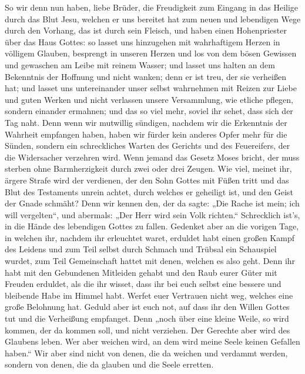  So wir denn nun haben, liebe Brüder, die Freudigkeit zum
Eingang in das Heilige durch das Blut Jesu,  welchen er
uns bereitet hat zum neuen und lebendigen Wege durch den Vorhang, das
ist durch sein Fleisch,  und haben einen Hohenpriester
über das Haus Gottes:  so lasset uns hinzugehen mit
wahrhaftigem Herzen in völligem Glauben, besprengt in unseren Herzen und
los von dem bösen Gewissen und gewaschen am Leibe mit reinem Wasser;
 und lasset uns halten an dem Bekenntnis der Hoffnung und
nicht wanken; denn er ist treu, der sie verheißen hat; 
und lasset uns untereinander unser selbst wahrnehmen mit Reizen zur
Liebe und guten Werken  und nicht verlassen unsere
Versammlung, wie etliche pflegen, sondern einander ermahnen; und das so
viel mehr, soviel ihr sehet, dass sich der Tag naht. 
Denn wenn wir mutwillig sündigen, nachdem wir die Erkenntnis der
Wahrheit empfangen haben, haben wir fürder kein anderes Opfer mehr für
die Sünden,  sondern ein schreckliches Warten des
Gerichts und des Feuereifers, der die Widersacher verzehren wird.
 Wenn jemand das Gesetz Moses bricht, der muss sterben
ohne Barmherzigkeit durch zwei oder drei Zeugen.  Wie
viel, meinet ihr, ärgere Strafe wird der verdienen, der den Sohn Gottes
mit Füßen tritt und das Blut des Testaments unrein achtet, durch welches
er geheiligt ist, und den Geist der Gnade schmäht?  Denn
wir kennen den, der da sagte: „Die Rache ist mein; ich will vergelten``,
und abermals: „Der Herr wird sein Volk richten.`` 
Schrecklich ist's, in die Hände des lebendigen Gottes zu fallen.
 Gedenket aber an die vorigen Tage, in welchen ihr,
nachdem ihr erleuchtet waret, erduldet habt einen großen Kampf des
Leidens  und zum Teil selbst durch Schmach und Trübsal
ein Schauspiel wurdet, zum Teil Gemeinschaft hattet mit denen, welchen
es also geht.  Denn ihr habt mit den Gebundenen Mitleiden
gehabt und den Raub eurer Güter mit Freuden erduldet, als die ihr
wisset, dass ihr bei euch selbst eine bessere und bleibende Habe im
Himmel habt.  Werfet euer Vertrauen nicht weg, welches
eine große Belohnung hat.  Geduld aber ist euch not, auf
dass ihr den Willen Gottes tut und die Verheißung empfanget.
 Denn „noch über eine kleine Weile, so wird kommen, der
da kommen soll, und nicht verziehen.  Der Gerechte aber
wird des Glaubens leben. Wer aber weichen wird, an dem wird meine Seele
keinen Gefallen haben.``  Wir aber sind nicht von denen,
die da weichen und verdammt werden, sondern von denen, die da glauben
und die Seele erretten.

